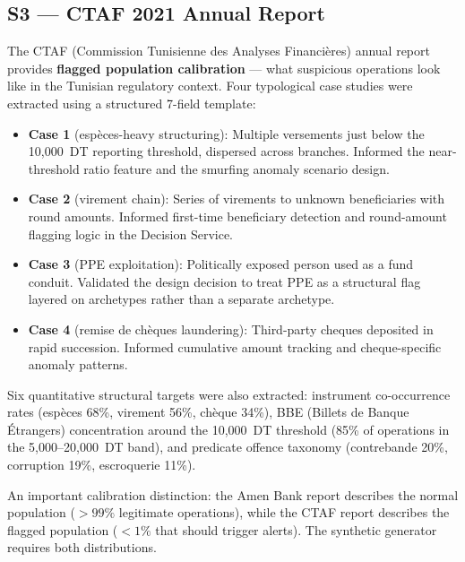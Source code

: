 \subsection{S3 --- CTAF 2021 Annual Report}

The CTAF (Commission Tunisienne des Analyses Financières) annual report provides
\textbf{flagged population calibration} --- what suspicious operations look like
in the Tunisian regulatory context. Four typological case studies were extracted
using a structured 7-field template:

\begin{itemize}[leftmargin=2cm]
    \item \textbf{Case 1} (espèces-heavy structuring): Multiple versements just
          below the 10,000~DT reporting threshold, dispersed across branches.
          Informed the near-threshold ratio feature and the smurfing anomaly
          scenario design.

    \item \textbf{Case 2} (virement chain): Series of virements to unknown
          beneficiaries with round amounts. Informed first-time beneficiary
          detection and round-amount flagging logic in the Decision Service.

    \item \textbf{Case 3} (PPE exploitation): Politically exposed person used as
          a fund conduit. Validated the design decision to treat PPE as a
          structural flag layered on archetypes rather than a separate archetype.

    \item \textbf{Case 4} (remise de chèques laundering): Third-party cheques
          deposited in rapid succession. Informed cumulative amount tracking and
          cheque-specific anomaly patterns.
\end{itemize}

Six quantitative structural targets were also extracted: instrument co-occurrence
rates (espèces 68\%, virement 56\%, chèque 34\%), BBE (Billets de Banque
Étrangers) concentration around the 10,000~DT threshold (85\% of operations in
the 5,000--20,000~DT band), and predicate offence taxonomy (contrebande 20\%,
corruption 19\%, escroquerie 11\%).

An important calibration distinction: the Amen Bank report describes the normal
population (${>}99\%$ legitimate operations), while the CTAF report describes the
flagged population (${<}1\%$ that should trigger alerts). The synthetic generator
requires both distributions.


